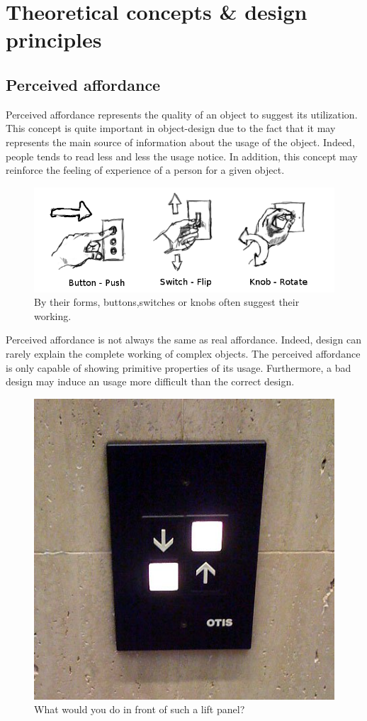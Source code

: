 \documentclass[a4paper,11pt] {article}
\theoremstyle{definition}
\begin{document}
\section{Theoretical concepts \& design principles}
\subsection{Perceived affordance}
Perceived affordance represents the quality of an object to suggest its utilization. This concept is quite important in object-design due to the fact that it may represents the main source of information about the usage of the object. Indeed, people tends to read less and less the usage notice. In addition, this concept may reinforce the feeling of experience of a person for a given object.
\begin{figure}[h]
\centering
\includegraphics[scale=0.40]{switches-only.png}
\caption{By their forms, buttons,switches or knobs often suggest their working.}
\end{figure}

Perceived affordance is not always the same as real affordance. Indeed, design can rarely explain the complete working of complex objects. The perceived affordance is only capable of showing primitive properties of its usage. Furthermore, a bad design may induce an usage more difficult than the correct design.%
\begin{figure}[h]
\centering
\includegraphics[scale=0.20]{bad-switches.jpg}
\caption{What would you do in front of such a lift panel?}
\end{figure}
\end{document}
